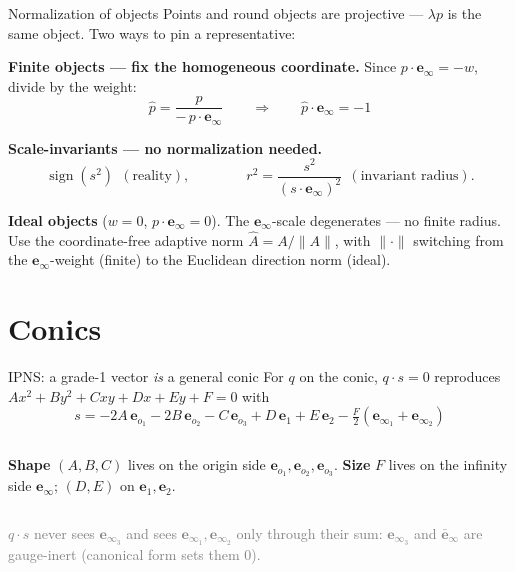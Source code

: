 \documentclass[aspectratio=169, 10pt]{beamer}
\newcommand{\einff}{\mathbf{e}_\infty}
\newcommand{\einfb}{\bar{\mathbf{e}}_\infty}
\newcommand{\eoi}[1]{\mathbf{e}_{o_{#1}}}
\newcommand{\einfi}[1]{\mathbf{e}_{\infty_{#1}}}
\newcommand{\dotp}{\cdot}
\begin{document}
\begin{frame}[t]{Normalization of objects}
  Points and round objects are projective --- $\lambda p$ is the same object. Two ways to pin
  a representative:
  \vspace{0.25cm}

  \textbf{Finite objects --- fix the homogeneous coordinate.}
  Since $p\dotp\einff=-w$, divide by the weight:
  \[
    \boxed{\;\hat p = \frac{p}{-\,p\dotp\einff}\qquad\Longrightarrow\qquad \hat p\dotp\einff=-1\;}
  \]
  \vspace{0.05cm}

  \textbf{Scale-invariants --- no normalization needed.}
  \[
    \operatorname{sign}(s^2)\ \ (\text{reality}),\qquad\qquad
    r^2=\frac{s^2}{(s\dotp\einff)^2}\ \ (\text{invariant radius}) .
  \]
  \vspace{0.05cm}

  \textbf{Ideal objects} ($w=0$, $p\dotp\einff=0$). The $\einff$-scale degenerates --- no finite
  radius. Use the coordinate-free \alert{adaptive norm} $\hat A = A/\lVert A\rVert$, with
  $\lVert\cdot\rVert$ switching from the $\einff$-weight (finite) to the Euclidean direction
  norm (ideal).
\end{frame}

\section{Conics}

\begin{frame}[t]{IPNS: a grade-1 vector \emph{is} a general conic}
  For $q$ on the conic, $q\dotp s=0$ reproduces $Ax^2+By^2+Cxy+Dx+Ey+F=0$ with
  \[
    \boxed{\;
      s = -2A\,\eoi1 - 2B\,\eoi2 - C\,\eoi3 + D\,\mathbf{e}_1 + E\,\mathbf{e}_2
          - \tfrac{F}{2}(\einfi1+\einfi2)
    \;}
  \]
  \vspace{0.2cm}
  \begin{columns}[T]
      \textbf{Shape} $(A,B,C)$ lives on the \alert{origin} side
      $\eoi1,\eoi2,\eoi3$.
      \textbf{Size} $F$ lives on the \alert{infinity} side $\einff$;
      $(D,E)$ on $\mathbf{e}_1,\mathbf{e}_2$.
  \end{columns}
  \vspace{0.3cm}
  \textcolor{gray}{$q\dotp s$ never sees $\einfi3$ and sees $\einfi1,\einfi2$ only through their sum: $\einfi3$ and $\einfb$ are \alert{gauge-inert} (canonical form sets them $0$).}
\end{frame}
\end{document}

